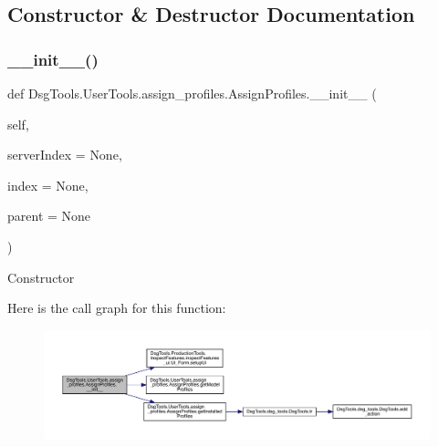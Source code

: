\subsection{Constructor \& Destructor Documentation}
\mbox{\label{class_dsg_tools_1_1_user_tools_1_1assign__profiles_1_1_assign_profiles_aa97bc57229c58e140fc6ae8631f75724}} 
\subsubsection{\texorpdfstring{\+\_\+\+\_\+init\+\_\+\+\_\+()}{\_\_init\_\_()}}
{\footnotesize\ttfamily def Dsg\+Tools.\+User\+Tools.\+assign\+\_\+profiles.\+Assign\+Profiles.\+\_\+\+\_\+init\+\_\+\+\_\+ (\begin{DoxyParamCaption}\item[{}]{self,  }\item[{}]{server\+Index = {\ttfamily None},  }\item[{}]{index = {\ttfamily None},  }\item[{}]{parent = {\ttfamily None} }\end{DoxyParamCaption})}

\begin{DoxyVerb}Constructor
\end{DoxyVerb}
 Here is the call graph for this function\+:
\nopagebreak
\begin{figure}[H]
\begin{center}
\leavevmode
\includegraphics[width=350pt]{class_dsg_tools_1_1_user_tools_1_1assign__profiles_1_1_assign_profiles_aa97bc57229c58e140fc6ae8631f75724_cgraph}
\end{center}
\end{figure}


